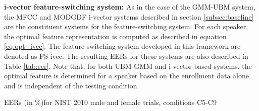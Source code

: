 \documentclass[preprint,12pt,5p]{elsarticle}
\begin{document}
\textbf{i-vector feature-switching system:}
As in the case of the GMM-UBM system, the MFCC and MODGDF i-vector systems
described in section \ref{subsec:baseline} are the constituent systems for the
feature-switching system. For each speaker, the optimal feature representation
is computed as described in equation \ref{eq:opt_ivec}. The feature-switching
system developed in this framework are denoted as FS-ivec.  The resulting EERs
for these systems are also described in Table \ref{tab:eer}.  Note that, for
both UBM-GMM and i-vector-based systems, the optimal feature is
determined for a speaker based on the enrollment data alone and is
independent of the testing condition.

\begin{table*}
\centering
\caption{EERs (in \%)for NIST 2010 male and female trials, conditions C5-C9 }


\end{table*}
\end{document}
